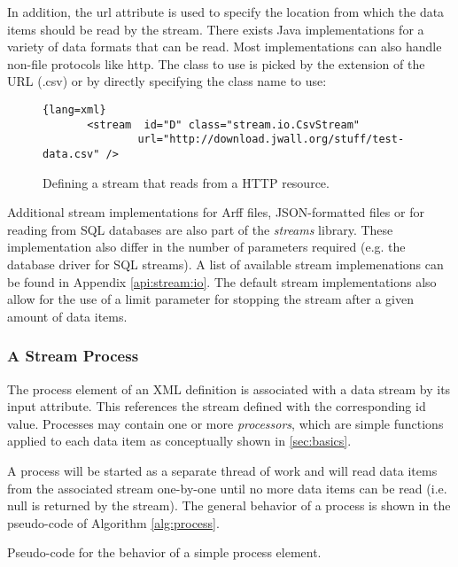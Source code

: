 In addition, the {\ttfamily url} attribute is used to specify the location
from which the data items should be read by the stream. There exists Java implementations
for a variety of data formats that can be read. Most implementations can also handle 
non-file protocols like {\ttfamily http}. The class to use is picked by the extension
of the URL ({\ttfamily .csv}) or by directly specifying the class name to use:
\begin{figure}[h!]{\footnotesize
    \centering
    \begin{lstlisting}{lang=xml}
       <stream  id="D" class="stream.io.CsvStream"
               url="http://download.jwall.org/stuff/test-data.csv" />
    \end{lstlisting}
    \caption{\label{fig:defStream}Defining a stream that reads from a HTTP resource.}
}
\end{figure}

Additional stream implementations for Arff files, JSON-formatted files or for reading 
from SQL databases are also part of the {\em streams} library. These implementation
also differ in the number of parameters required (e.g. the database driver for SQL
streams). A list of available stream implemenations can be found in Appendix \ref{api:stream:io}.
The default stream implementations also allow for the use of a {\ttfamily limit} parameter
for stopping the stream after a given amount of data items.

\subsubsection{A Stream Process}
The {\ttfamily process} element of an XML definition is associated with a data stream
by its {\ttfamily input} attribute. This references the stream defined with the corresponding
{\ttfamily id} value. Processes may contain one or more {\em processors}, which are simple
functions applied to each data item as conceptually shown in \ref{sec:basics}.

A process will be started as a separate thread of work and will read data items from
the associated stream one-by-one until no more data items can be read (i.e. 
{\ttfamily null} is returned by the stream). The general behavior of a process is
shown in the pseudo-code of Algorithm \ref{alg:process}.

\begin{algorithm}
\begin{algorithmic}
\Statex
{}
         \Else
         \EndIf
      \EndFor
   \EndWhile
\EndFunction
\end{algorithmic}
\caption{\label{alg:process}Pseudo-code for the behavior of a simple {\ttfamily process} element.}
\end{algorithm}

